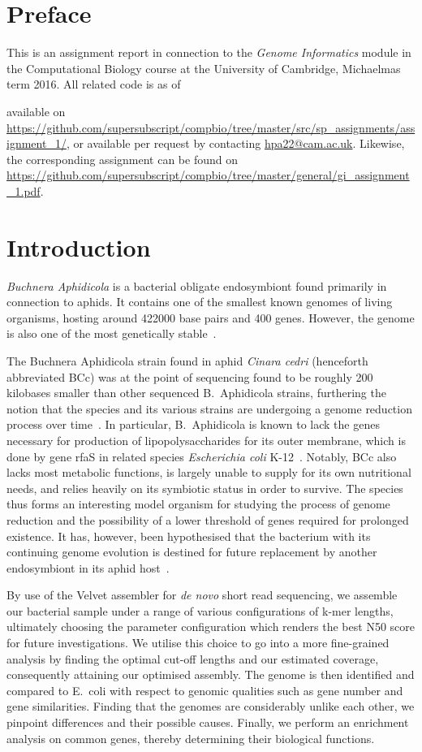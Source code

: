 \documentclass[10pt]{article}\usepackage[]{graphicx}\usepackage[]{color}
\theoremstyle{plain}
\theoremstyle{definition}
\begin{document}
\begin{multicols}{2}
\section*{Preface}
This is an assignment report in connection to the \textit{Genome Informatics} module in the Computational Biology course at the University of Cambridge, Michaelmas term 2016. All related code is as of \date{\today} available on \url{https://github.com/supersubscript/compbio/tree/master/src/sp_assignments/assignment_1/}, or available per request by contacting \href{mailto:hpa22@cam.ac.uk}{hpa22@cam.ac.uk}. Likewise, the corresponding assignment can be found on \url{https://github.com/supersubscript/compbio/tree/master/general/gi_assignment_1.pdf}.

\section{Introduction}
\textit{Buchnera Aphidicola} is a bacterial obligate endosymbiont found primarily in connection to aphids. It contains one of the smallest known genomes of living organisms, hosting around 422000 base pairs and 400 genes. However, the genome is also one of the most genetically stable~\cite{Silva2003176}. 

The Buchnera Aphidicola strain found in aphid \textit{Cinara cedri} (henceforth abbreviated BCc) was at the point of sequencing found to be roughly 200 kilobases smaller than other sequenced B.\ Aphidicola strains, furthering the notion that the species and its various strains are undergoing a genome reduction process over time~\cite{2006Perez}. In particular, B.\ Aphidicola is known to lack the genes necessary for production of lipopolysaccharides for its outer membrane, which is done by gene rfaS in related species \textit{Escherichia coli} K-12~\cite{shigenobu2000genome}. Notably, BCc also lacks most metabolic functions, is largely unable to supply for its own nutritional needs, and relies heavily on its symbiotic status in order to survive. The species thus forms an interesting model organism for studying the process of genome reduction and the possibility of a lower threshold of genes required for prolonged existence. It has, however, been hypothesised that the bacterium with its continuing genome evolution is destined for future replacement by another endosymbiont in its aphid host~\cite{2006Perez}.

By use of the Velvet assembler for \textit{de novo} short read sequencing, we assemble our bacterial sample under a range of various configurations of k-mer lengths, ultimately choosing the parameter configuration which renders the best N50 score for future investigations. We utilise this choice to go into a more fine-grained analysis by finding the optimal cut-off lengths and our estimated coverage, consequently attaining our optimised assembly. The genome is then identified and compared to E.\ coli with respect to genomic qualities such as gene number and gene similarities. Finding that the genomes are considerably unlike each other, we pinpoint differences and their possible causes. Finally, we perform an enrichment analysis on common genes, thereby determining their biological functions. 


\end{multicols}
\end{document}
